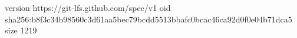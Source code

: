 version https://git-lfs.github.com/spec/v1
oid sha256:b8f3c34b98560c3d61aa5bec79bcdd5513bbafc0bcac46ca92d0f0e04b71dca5
size 1219
